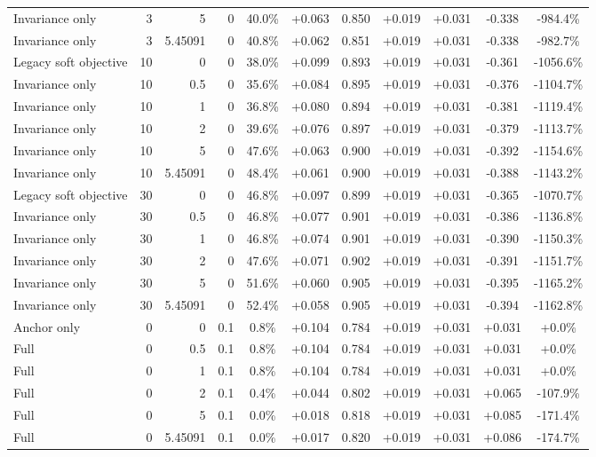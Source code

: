 \begin{table}[htbp]
\begin{tabular}{lrrrccccccc}
Invariance only & 3 & 5 & 0 & 40.0\% & +0.063 & 0.850 & +0.019 & +0.031 & -0.338 & -984.4\% \\
Invariance only & 3 & 5.45091 & 0 & 40.8\% & +0.062 & 0.851 & +0.019 & +0.031 & -0.338 & -982.7\% \\
Legacy soft objective & 10 & 0 & 0 & 38.0\% & +0.099 & 0.893 & +0.019 & +0.031 & -0.361 & -1056.6\% \\
Invariance only & 10 & 0.5 & 0 & 35.6\% & +0.084 & 0.895 & +0.019 & +0.031 & -0.376 & -1104.7\% \\
Invariance only & 10 & 1 & 0 & 36.8\% & +0.080 & 0.894 & +0.019 & +0.031 & -0.381 & -1119.4\% \\
Invariance only & 10 & 2 & 0 & 39.6\% & +0.076 & 0.897 & +0.019 & +0.031 & -0.379 & -1113.7\% \\
Invariance only & 10 & 5 & 0 & 47.6\% & +0.063 & 0.900 & +0.019 & +0.031 & -0.392 & -1154.6\% \\
Invariance only & 10 & 5.45091 & 0 & 48.4\% & +0.061 & 0.900 & +0.019 & +0.031 & -0.388 & -1143.2\% \\
Legacy soft objective & 30 & 0 & 0 & 46.8\% & +0.097 & 0.899 & +0.019 & +0.031 & -0.365 & -1070.7\% \\
Invariance only & 30 & 0.5 & 0 & 46.8\% & +0.077 & 0.901 & +0.019 & +0.031 & -0.386 & -1136.8\% \\
Invariance only & 30 & 1 & 0 & 46.8\% & +0.074 & 0.901 & +0.019 & +0.031 & -0.390 & -1150.3\% \\
Invariance only & 30 & 2 & 0 & 47.6\% & +0.071 & 0.902 & +0.019 & +0.031 & -0.391 & -1151.7\% \\
Invariance only & 30 & 5 & 0 & 51.6\% & +0.060 & 0.905 & +0.019 & +0.031 & -0.395 & -1165.2\% \\
Invariance only & 30 & 5.45091 & 0 & 52.4\% & +0.058 & 0.905 & +0.019 & +0.031 & -0.394 & -1162.8\% \\
Anchor only & 0 & 0 & 0.1 & 0.8\% & +0.104 & 0.784 & +0.019 & +0.031 & +0.031 & +0.0\% \\
Full & 0 & 0.5 & 0.1 & 0.8\% & +0.104 & 0.784 & +0.019 & +0.031 & +0.031 & +0.0\% \\
Full & 0 & 1 & 0.1 & 0.8\% & +0.104 & 0.784 & +0.019 & +0.031 & +0.031 & +0.0\% \\
Full & 0 & 2 & 0.1 & 0.4\% & +0.044 & 0.802 & +0.019 & +0.031 & +0.065 & -107.9\% \\
Full & 0 & 5 & 0.1 & 0.0\% & +0.018 & 0.818 & +0.019 & +0.031 & +0.085 & -171.4\% \\
Full & 0 & 5.45091 & 0.1 & 0.0\% & +0.017 & 0.820 & +0.019 & +0.031 & +0.086 & -174.7\% \\

\end{tabular}
\end{table}

